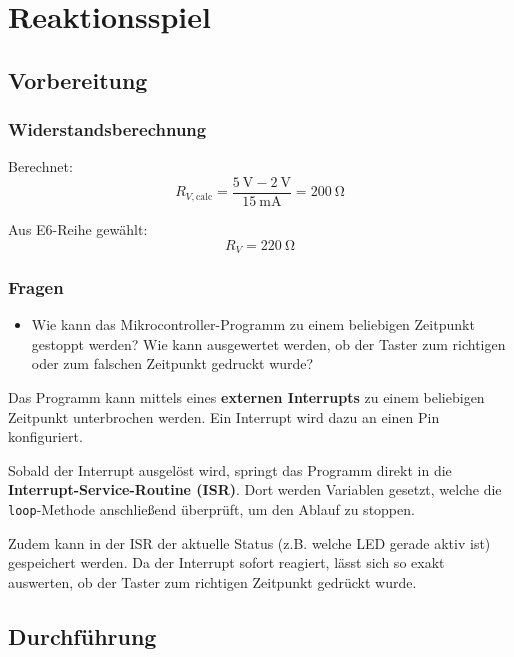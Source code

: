 
\section{Reaktionsspiel}

\subsection{Vorbereitung}
\subsubsection{Widerstandsberechnung}

Berechnet:
\[
    R_{V,\text{calc}} = \frac{\SI{5}{\volt} - \SI{2}{\volt}}{\SI{15}{\milli\ampere}} = \SI{200}{\ohm}
\]

 Aus E6-Reihe gewählt:
\[
    R_{V} = \SI{220}{\ohm}
\]

\subsubsection{Fragen}

\begin{block}
    \begin{itemize}
    \item[\faQuestion] Wie kann das Mikrocontroller-Programm zu einem beliebigen Zeitpunkt gestoppt werden? Wie kann ausgewertet werden, ob der Taster zum richtigen oder zum falschen Zeitpunkt gedruckt wurde? 
    \end{itemize}
\end{block}

Das Programm kann mittels eines \textbf{externen Interrupts} zu einem beliebigen Zeitpunkt unterbrochen werden. Ein Interrupt wird dazu an einen Pin konfiguriert. 

Sobald der Interrupt ausgelöst wird, springt das Programm direkt in die \textbf{Interrupt-Service-Routine (ISR)}. Dort werden Variablen gesetzt, welche die \texttt{loop}-Methode anschließend überprüft, um den Ablauf zu stoppen. 

Zudem kann in der ISR der aktuelle Status (z.B. welche LED gerade aktiv ist) gespeichert werden. Da der Interrupt sofort reagiert, lässt sich so exakt auswerten, ob der Taster zum richtigen Zeitpunkt gedrückt wurde.


\subsection{Durchführung}

